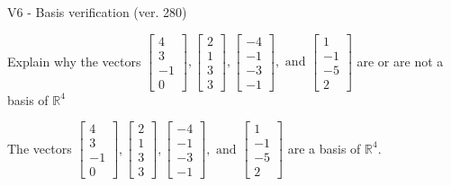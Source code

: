 \begin{exercise}
  \begin{exerciseTitle}V6 - Basis verification (ver. 280)\end{exerciseTitle}
  \begin{exerciseStatement}
    Explain why the vectors \(\left[\begin{array}{r}
4 \\
3 \\
-1 \\
0
\end{array}\right] , \left[\begin{array}{r}
2 \\
1 \\
3 \\
3
\end{array}\right] , \left[\begin{array}{r}
-4 \\
-1 \\
-3 \\
-1
\end{array}\right] , \text{ and } \left[\begin{array}{r}
1 \\
-1 \\
-5 \\
2
\end{array}\right]\) are or are not a basis of \(\mathbb{R}^4\)	


  \end{exerciseStatement}
  \begin{exerciseAnswer}
   The vectors \(\left[\begin{array}{r}
4 \\
3 \\
-1 \\
0
\end{array}\right] , \left[\begin{array}{r}
2 \\
1 \\
3 \\
3
\end{array}\right] , \left[\begin{array}{r}
-4 \\
-1 \\
-3 \\
-1
\end{array}\right] , \text{ and } \left[\begin{array}{r}
1 \\
-1 \\
-5 \\
2
\end{array}\right]\) 
  	 are  a basis of \(\mathbb{R}^4\).
  


  \end{exerciseAnswer}
\end{exercise}